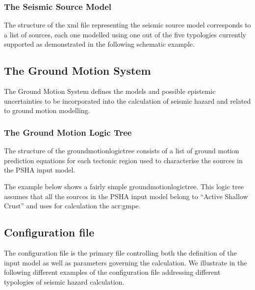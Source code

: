 \subsubsection{The Seismic Source Model}
The structure of the xml file representing the seismic source 
model corresponds to a list of sources, each one modelled using 
one out of the five typologies currently supported as demonstrated in 
the following schematic example.

%
\subsection{The Ground Motion System}
The Ground Motion System defines the models and possible epistemic 
uncertainties to be incorporated into the calculation of seismic hazard
and related to ground motion modelling.
%
\subsubsection{The Ground Motion Logic Tree}
\label{ref:gmlt_example}
The structure of the \gls{groundmotionlogictree} consists of a list 
of ground motion prediction equations for each tectonic region used to
characterise the sources in the PSHA input model.

The example below shows a fairly simple \gls{groundmotionlogictree}. 
This logic tree assumes that all the sources in the PSHA input model 
belong to ``Active Shallow Crust'' and uses for calculation the 
\citet{chiou2008} \gls{acr:gmpe}.

%
\subsection{Configuration file}
\label{sec:conf_file}
The configuration file is the primary file controlling both the 
definition of the input model as well as parameters governing the 
calculation. We illustrate in the following different examples of 
the configuration file addressing different typologies of seismic 
hazard calculation.



